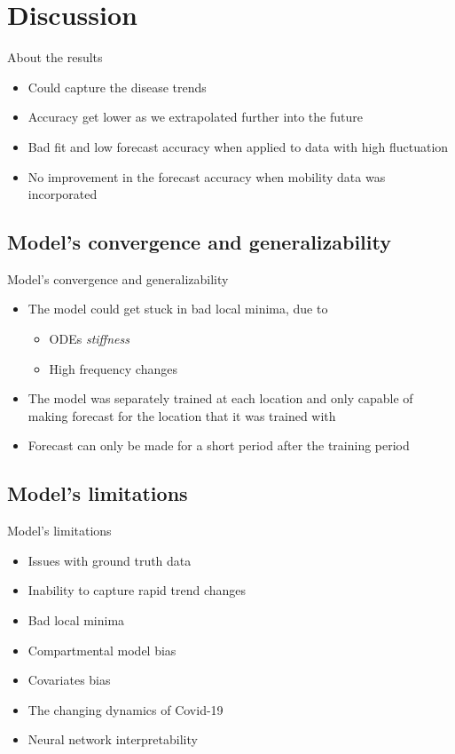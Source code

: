 \section{Discussion}

\begin{frame}{About the results}
    \begin{itemize}
        \item<1-> Could capture the disease trends
        \item<2-> Accuracy get lower as we extrapolated further into the future
        \item<3-> Bad fit and low forecast accuracy when applied to data with high fluctuation
        \item<4-> No improvement in the forecast accuracy when mobility data was incorporated
    \end{itemize}
\end{frame}

\subsection{Model's convergence and generalizability}

\begin{frame}{Model's convergence and generalizability}
    \begin{itemize}
        \item<1-> The model could get stuck in bad local minima, due to
        \begin{itemize}
            \item \glspl{ODE} \textit{stiffness}
            \item High frequency changes
        \end{itemize}
        \item<2-> The model was separately trained at each location and only capable of making forecast for the location that it was trained with
        \item<3-> Forecast can only be made for a short period after the training period
    \end{itemize}
\end{frame}

\subsection{Model's limitations}

\begin{frame}{Model's limitations}
    \begin{itemize}
        \item<1-> Issues with ground truth data
        \item<2-> Inability to capture rapid trend changes
        \item<3-> Bad local minima
        \item<4-> Compartmental model bias
        \item<5-> Covariates bias
        \item<6-> The changing dynamics of Covid-19
        \item<7-> Neural network interpretability
    \end{itemize}
\end{frame}